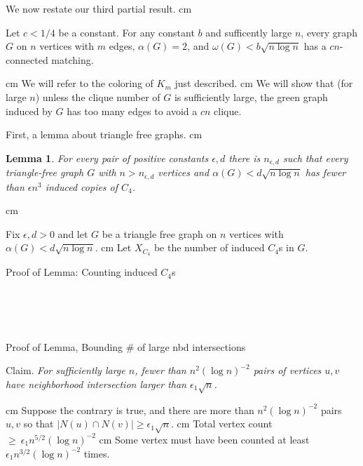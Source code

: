 \documentclass{beamer}
\newtheorem{lem}{Lemma}
\newcommand{\blem}[1]{\begin{lem}#1\end{lem}}
\newcommand{\bframe}[2]{\begin{frame}{#1}#2\end{frame}}
\begin{document}
\bframe{}{

We now restate our third partial result. \pause\vskip 0.5 cm
\begin{theorem}
Let $c < 1/4$ be a constant.  For any constant $b$ and sufficently large $n$, every graph $G$ on $n$ vertices with $m$ edges, $\alpha(G) = 2$, and $\omega(G) < b\sqrt{n\log n}$ has a $cn$-connected matching.
\label{sm_cli}
\end{theorem}
\pause\vskip 0.5 cm
We will refer to the coloring of $K_m$ just described.  \pause\vskip 0.8 cm
We will show that (for large $n$) unless the clique number of $G$ is sufficiently large, the green graph induced by $G$ has too many edges to avoid a $cn$ clique. 
}

\bframe{}{

First, a lemma about triangle free graphs.\pause\vskip 0.5 cm 
\blem{For every pair of positive constants $\epsilon, d$ there is $n_{\epsilon, d}$ such that every triangle-free graph $G$ with $n > n_{\epsilon, d}$ vertices and $\alpha(G) < d\sqrt{n\log n}$ has fewer than $\epsilon n^3$ induced copies of $C_4$.}\pause \vskip 0.5 cm

Fix $\epsilon, d> 0$ and let $G$ be a triangle free graph on $n$ vertices with $\alpha(G) < d\sqrt{n\log n}$. \pause \vskip 0.8 cm
Let $X_{C_4}$ be the number of induced $C_4$s in $G$.  

}

\bframe{Proof of Lemma: Counting induced $C_4$s}{
\pause
\begin{center}
\begin{overprint}
	\onslide<2>\hspace{3.5cm}\\
	\onslide<3>\hspace{3.5cm}\\
	\onslide<4>\hspace{3.5cm}\\
	\onslide<5->\hspace{3.5cm}
\end{overprint}
\end{center}
\uncover<6->{\[X_{C_4} = \frac{1}{2}\sum_{\{u,v\}\notin E(G)} {|N(u) \cap N(v)| \choose 2}\]}
\uncover<7>{Set $\epsilon_1 < \sqrt{8\epsilon}$.}
}


	\bframe{Proof of Lemma, Bounding \# of large nbd intersections}{\pause
\vspace{-4pt}
\begin{framed} Claim. \textit{For sufficiently large $n$, fewer than $n^2(\log n)^{-2}$ pairs of vertices $u,v$ have neighborhood intersection larger than $\epsilon_1\sqrt{n}$.}
\end{framed}\pause \vskip 1 cm
Suppose the contrary is true, and there are more than $n^2(\log n)^{-2}$ pairs $u,v$ so that $|N(u)\cap N(v)| \geq \epsilon_1\sqrt{n}$. \pause \vskip 0.5 cm
Total vertex count\hspace{10pt}\pause $\geq\:\epsilon_1n^{5/2}(\log n)^{-2}$\pause \vskip 0.5 cm
Some vertex must have been counted at least $\epsilon_1n^{3/2}(\log n)^{-2}$ times. 
}
\end{document}
